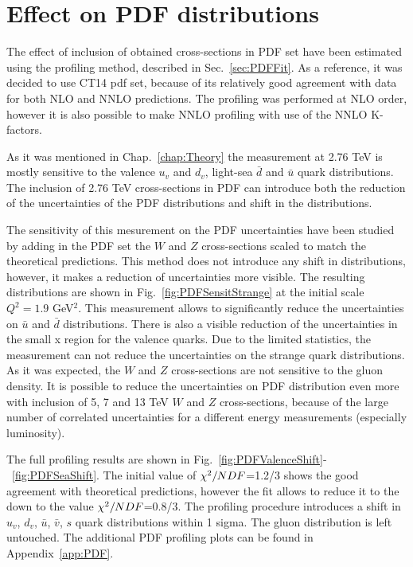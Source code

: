 \section{Effect on PDF distributions}\label{sec:PDFCs}

The effect of inclusion of obtained cross-sections in PDF set have been estimated using the profiling method, described in Sec.~\ref{sec:PDFFit}. As a reference, it was decided to use CT14 pdf set, because of its relatively good agreement with data for both NLO and NNLO predictions. The profiling was performed at NLO order, however it is also possible to make NNLO profiling with use of the NNLO K-factors.

As it was mentioned in Chap.~\ref{chap:Theory} the measurement at 2.76 TeV is mostly sensitive to the valence $u_v$ and $d_v$, light-sea $\bar{d}$ and $\bar{u}$ quark distributions. The inclusion of 2.76 TeV cross-sections in PDF can introduce both the reduction of the uncertainties of the PDF distributions and shift in the distributions. 

The sensitivity of this mesurement on the PDF uncertainties have been studied by adding in the PDF set the $W$ and $Z$ cross-sections scaled to match the theoretical predictions. This method does not introduce any shift in distributions, however, it makes a reduction of uncertainties more visible. The resulting distributions are shown in Fig.~\ref{fig:PDFSensitStrange} at the initial scale $Q^2=1.9$ GeV$^2$. This measurement allows to significantly reduce the uncertainties on $\bar{u}$ and $\bar{d}$ distributions. There is also a visible reduction of the uncertainties in the small x region for the valence quarks. Due to the limited statistics, the measurement can not reduce the uncertainties on the strange quark distributions. As it was expected, the $W$ and $Z$ cross-sections are not sensitive to the gluon density. It is possible to reduce the uncertainties on PDF distribution even more with inclusion of 5, 7 and 13 TeV $W$ and $Z$ cross-sections, because of the large number of correlated uncertainties for a different energy measurements (especially luminosity).

The full profiling results are shown in Fig.~\ref{fig:PDFValenceShift}-~\ref{fig:PDFSeaShift}. The initial value of $\chi^2/NDF$=1.2/3 shows the good agreement with theoretical predictions, however the fit allows to reduce it to the down to the value $\chi^2/NDF$=0.8/3. The profiling procedure introduces a shift in $u_v$, $d_v$, $\bar{u}$, $\bar{v}$, $s$ quark distributions within 1 sigma.  The gluon distribution is left untouched. The additional PDF profiling plots can be found in Appendix~\ref{app:PDF}.

